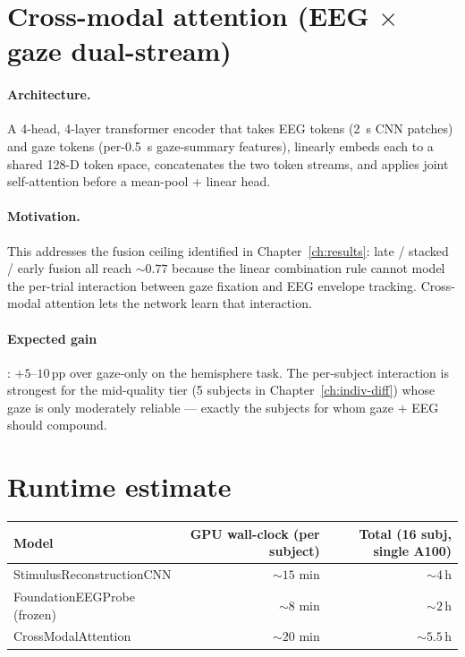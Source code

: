 \section{Cross-modal attention (EEG $\times$ gaze dual-stream)}

\paragraph{Architecture.} A 4-head, 4-layer transformer encoder that
takes EEG tokens (\SI{2}{\second} CNN patches) and gaze tokens
(per-\SI{0.5}{\second} gaze-summary features), linearly embeds each
to a shared 128-D token space, concatenates the two token streams, and
applies joint self-attention before a mean-pool + linear head.

\paragraph{Motivation.} This addresses the fusion ceiling identified in
Chapter~\ref{ch:results}: late / stacked / early fusion all reach
$\sim 0.77$ because the linear combination rule cannot model the
per-trial interaction between gaze fixation and EEG envelope tracking.
Cross-modal attention lets the network learn that interaction.

\paragraph{Expected gain}: $+5$--$10$\,pp over gaze-only on the
hemisphere task. The per-subject interaction is strongest for the
mid-quality tier (5 subjects in Chapter~\ref{ch:indiv-diff}) whose
gaze is only moderately reliable — exactly the subjects for whom
gaze + EEG should compound.

\section{Runtime estimate}

\begin{table}[ht]
\centering
\begin{tabular}{lrr}
\toprule
Model & GPU wall-clock (per subject) & Total (16 subj, single A100) \\
\midrule
StimulusReconstructionCNN   & $\sim 15$ min & $\sim 4$\,h \\
FoundationEEGProbe (frozen) & $\sim 8$ min  & $\sim 2$\,h \\
CrossModalAttention         & $\sim 20$ min & $\sim 5.5$\,h \\
\bottomrule
\end{tabular}
\end{table}

